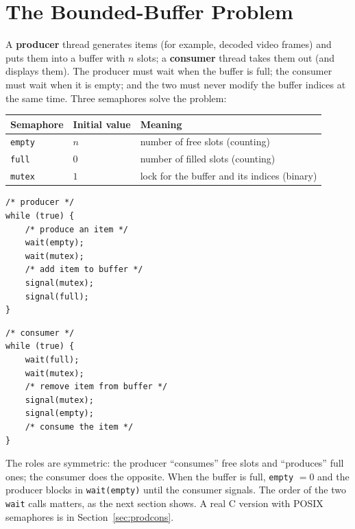 \documentclass[11pt,a4paper]{article}
\newcommand{\term}[1]{\textbf{\color{mintdeep}#1}}
\begin{document}
\section{The Bounded-Buffer Problem}

A \term{producer} thread generates items (for example, decoded video frames) and puts them into a buffer with $n$ slots; a \term{consumer} thread takes them out (and displays them). The producer must wait when the buffer is full; the consumer must wait when it is empty; and the two must never modify the buffer indices at the same time. Three semaphores solve the problem:

\begin{center}
\renewcommand{\arraystretch}{1.2}
\begin{tabular}{@{}lll@{}}
\toprule
\textbf{Semaphore} & \textbf{Initial value} & \textbf{Meaning}\\
\midrule
\texttt{empty} & $n$ & number of free slots (counting)\\
\texttt{full} & $0$ & number of filled slots (counting)\\
\texttt{mutex} & $1$ & lock for the buffer and its indices (binary)\\
\bottomrule
\end{tabular}
\end{center}

\begin{center}
\begin{minipage}[t]{0.46\linewidth}
\begin{lstlisting}[numbers=none]
/* producer */
while (true) {
    /* produce an item */
    wait(empty);
    wait(mutex);
    /* add item to buffer */
    signal(mutex);
    signal(full);
}
\end{lstlisting}
\end{minipage}\hfill
\begin{minipage}[t]{0.46\linewidth}
\begin{lstlisting}[numbers=none]
/* consumer */
while (true) {
    wait(full);
    wait(mutex);
    /* remove item from buffer */
    signal(mutex);
    signal(empty);
    /* consume the item */
}
\end{lstlisting}
\end{minipage}
\end{center}

The roles are symmetric: the producer ``consumes'' free slots and ``produces'' full ones; the consumer does the opposite. When the buffer is full, \texttt{empty} $=0$ and the producer blocks in \texttt{wait(empty)} until the consumer signals. The order of the two \texttt{wait} calls matters, as the next section shows. A real C version with POSIX semaphores is in Section~\ref{sec:prodcons}.
\end{document}
